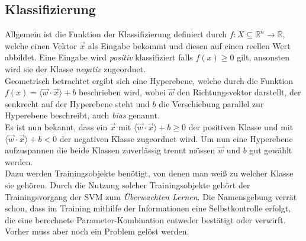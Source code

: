 \subsection{Klassifizierung}

Allgemein ist die Funktion der Klassifizierung definiert durch $f:X\subseteq\mathbb{R}^n\to\mathbb{R}$, welche einen Vektor $\vec{x}$ als Eingabe bekommt und diesen auf einen reellen Wert abbildet. Eine Eingabe wird \emph{positiv} klassifiziert falls $f(x) \ge 0$ gilt, ansonsten wird sie der Klasse \emph{negativ} zugeordnet. \cite{cristianini2000introduction}\\
Geometrisch betrachtet ergibt sich eine Hyperebene, welche durch die Funktion $f(x)=\langle\vec{w}\cdot\vec{x}\rangle+b$ beschrieben wird, wobei $\vec{w}$ den Richtungsvektor darstellt, der senkrecht auf der Hyperebene steht und $b$ die Verschiebung parallel zur Hyperebene beschreibt, auch \emph{bias} genannt.\\
Es ist nun bekannt, dass ein $\vec{x}$ mit $\langle\vec{w}\cdot\vec{x}\rangle+b\ge0$ der positiven Klasse und mit $\langle\vec{w}\cdot\vec{x}\rangle+b<0$ der negativen Klasse zugeordnet wird. Um nun eine Hyperebene aufzuspannen die beide Klassen zuverlässig trennt müssen $\vec{w}$ und $b$ gut gewählt werden.\\
Dazu werden Trainingsobjekte benötigt, von denen man weiß zu welcher Klasse sie gehören. Durch die Nutzung solcher Trainingsobjekte gehört der Trainingsvorgang der SVM zum \emph{Überwachten Lernen}. Die Namensgebung verrät schon, dass im Training mithilfe der Informationen eine Selbstkontrolle erfolgt, die eine berechnete Parameter-Kombination entweder bestätigt oder verwirft.\\
Vorher muss aber noch ein Problem gelöst werden.

